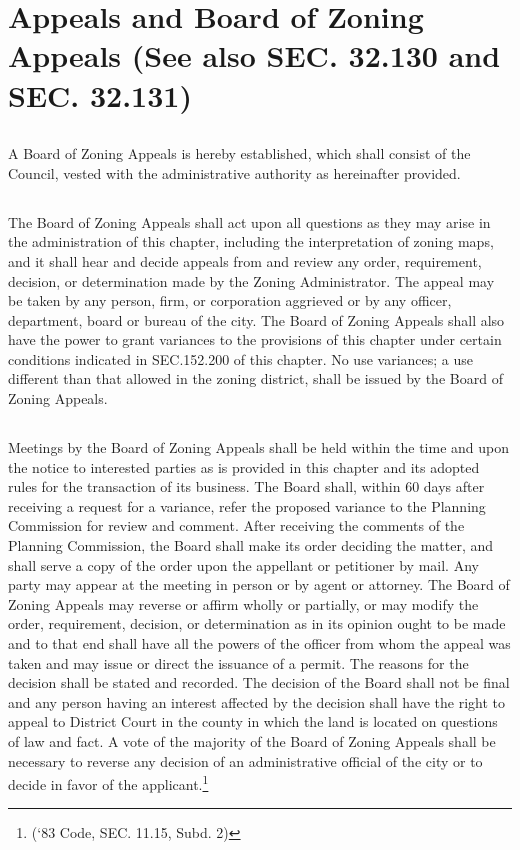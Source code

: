 \section{Appeals and Board of Zoning Appeals (See also SEC. 32.130 and SEC. 32.131)}
\subsection{}
A Board of Zoning Appeals is hereby established, which shall consist of the Council, vested with the administrative authority as hereinafter provided.
\subsection{}
The Board of Zoning Appeals shall act upon all questions as they may arise in the administration of this chapter, including the interpretation of zoning maps, and it shall hear and decide appeals from and review any order, requirement, decision, or determination made by the Zoning Administrator. The appeal may be taken by any person, firm, or corporation aggrieved or by any officer, department, board or bureau of the city. The Board of Zoning Appeals shall also have the power to grant variances to the provisions of this chapter under certain conditions indicated in SEC.152.200 of this chapter. No use variances; a use different than that allowed in the zoning district, shall be issued by the Board of Zoning Appeals.
\subsection{}
Meetings by the Board of Zoning Appeals shall be held within the time and upon the notice to interested parties as is provided in this chapter and its adopted rules for the transaction of its business. The Board shall, within 60 days after receiving a request for a variance, refer the proposed variance to the Planning Commission for review and comment. After receiving the comments of the Planning Commission, the Board shall make its order deciding the matter, and shall serve a copy of the order upon the appellant or petitioner by mail. Any party may appear at the meeting in person or by agent or attorney. The Board of Zoning Appeals may reverse or affirm wholly or partially, or may modify the order, requirement, decision, or determination as in its opinion ought to be made and to that end shall have all the powers of the officer from whom the appeal was taken and may issue or direct the issuance of a permit. The reasons for the decision shall be stated and recorded.  The decision of the Board shall not be final and any person having an interest affected by the decision shall have the right to appeal to District Court in the county in which the land is located on questions of law and fact. A vote of the majority of the Board of Zoning Appeals shall be necessary to reverse any decision of an administrative official of the city or to decide in favor of the applicant.\footnote{(‘83 Code, SEC. 11.15, Subd. 2)}
